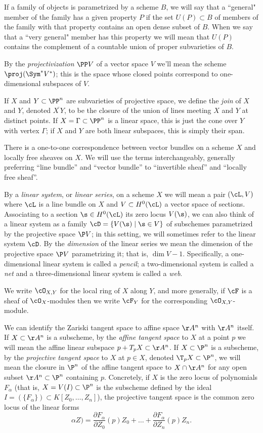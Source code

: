 If a family of objects is parametrized by a scheme $B$, we will say that a ``general" member of the family has a given property $P$ if the set $U(P) \subset B$ of members of the family with that property contains an open dense subset of $B$. When we say that a ``very general" member has this property  we will mean that $U(P)$ contains the complement of a countable union of proper subvarieties of $B$.


By the \emph{projectivization} $\PP V$ of a vector space $V$ we'll mean the scheme $\proj(\Sym^* V^*)$; this is the space whose closed points correspond to one-dimensional subspaces of $V$.

If $X$ and $Y \subset \PP^n$ are subvarieties of projective space, we define the \emph{join} of $X$ and $Y$, denoted $\overline{X\,Y}$, to be the closure of the union of lines meeting $X$ and $Y$ at distinct points. If $X = \Gamma \subset \PP^n$ is a linear space, this is just the cone over $Y$ with vertex $\Gamma$; if $X$ and $Y$ are both linear subspaces, this is simply their span.

There is a one-to-one correspondence between vector bundles on a scheme $X$ and locally free sheaves on $X$. We will use the terms interchangeably, generally preferring ``line bundle'' and ``vector bundle'' to ``invertible sheaf'' and ``locally free sheaf''.


By a \emph{linear system}, or \emph{linear series}, on a scheme $X$ we will mean a pair $(\cL, V)$ where $\cL$ is a line bundle on $X$ and $V \subset H^0(\cL)$ a vector space of sections. Associating to a section $\s \in H^0(\cL)$ its zero locus $V(\s)$, we can also think of a linear system as a family $\cD = \{ V(\s) \mid \s \in V\}$ of subschemes parametrized by the projective space $\P V$; in this setting, we will sometimes refer to the linear system $\cD$. By the \emph{dimension} of the linear series we mean the dimension of the projective space $\P V$ parametrizing it; that is, $\dim V - 1$. Specifically, a one-dimensional linear system is called a \emph{pencil}; a two-dimensional system is called a \emph{net} and a three-dimensional linear system is called a \emph{web}.

We write $\cO_{X,Y}$
for the local ring of $X$ along $Y$, and more generally, if $\cF$ is a sheaf of
$\cO_{X}$-modules then we write $\cF_Y$ for the 
corresponding $\cO_{X,Y}$-module.

We can identify the Zariski tangent space to affine space $\AA^n$ with $\AA^n$ itself. If $X \subset \AA^n$ is a subscheme, by the \emph{affine tangent space} to $X$ at a point $p$ we will mean the affine linear subspace $p + T_pX \subset \AA^n$. If $X \subset \P^n$ is a subscheme, by the \emph{projective tangent space} to $X$ at $p \in X$, denoted $\T_pX \subset \P^n$, we will mean the closure in $\P^n$ of the affine tangent space to $X \cap \AA^n$ for any open subset $\AA^n \subset \P^n$ containing $p$. Concretely, if $X$ is the zero locus of polynomials $F_\alpha$ (that is, $X = V(I) \subset \P^n$ is the subscheme defined by the ideal $I = (\{F_\alpha\}) \subset K[Z_0,\dots,Z_n]$), the projective tangent space is the common zero locus of the linear forms
$$
\alpha Z) = \frac{\partial F_\alpha}{\partial Z_0}(p)Z_0 + \dots + \frac{\partial F_\alpha}{\partial Z_n}(p)Z_n.
$$

